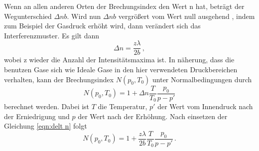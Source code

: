 Wenn an allen anderen Orten der Brechungsindex den Wert n hat, beträgt der Wegunterschied $\Delta n b$. Wird nun $\Delta n b$ vergrößert vom Wert null ausgehend , indem zum Beispiel der Gasdruck erhöht wird, dann verändert sich das Interferenzmuster.
Es gilt dann
\begin{equation}
    \Delta n = \frac{z \lambda}{2 b}\, ,
    \label{eqn:delt n}
\end{equation}
wobei z wieder die Anzahl der Intensitätsmaxima ist. In näherung, dass die benutzen Gase sich wie Ideale Gase in den hier verwendeten Druckbereichen verhalten, kann der Brechungsindex
$N(p_0,T_0)$ unter Normalbedingungen durch
\begin{equation*}
    N(p_0 , T_0)=1+ \Delta n \frac{T}{T_0} \frac{p_0}{p-p'} 
\end{equation*}
berechnet werden. Dabei ist $T$ die Temperatur, $p'$ der Wert vom Innendruck nach der Erniedrigung und $p$ der Wert nach der Erhöhung.
Nach einsetzen der Gleichung \eqref{eqn:delt n} folgt
\begin{equation}
    N(p_0 , T_0)=1+ \frac{z \lambda}{2 b} \frac{T}{T_0} \frac{p_0}{p-p'}  \, .
    \label{eqn:brechen}
\end{equation}

